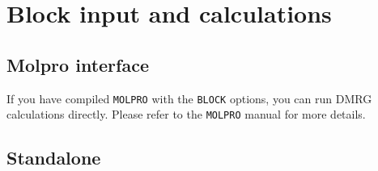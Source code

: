 \documentclass[letterpaper,12pt,aps, pra]{revtex4-1}
\begin{document}




\section{Block input and calculations}

\subsection{Molpro interface}

If you have compiled \texttt{MOLPRO} with the \texttt{BLOCK} options, you can run DMRG calculations directly. Please refer to the \texttt{MOLPRO} manual for more details.


\subsection{Standalone}
\end{document}

